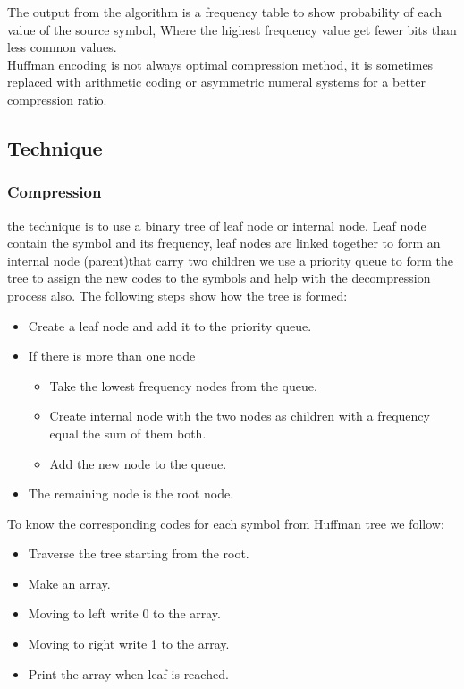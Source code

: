 \documentclass[14 pt,a4paper,double column]{article}
\begin{document}
The output from the algorithm is a frequency table to show  probability of each value of the source symbol, Where the highest frequency value get fewer bits than less common values.\\


Huffman encoding is not always optimal compression method, it is sometimes replaced with arithmetic coding or asymmetric numeral systems for a better compression ratio.\\
\subsection{Technique}
\subsubsection{Compression}
the technique is to use a binary tree of leaf node or internal node. Leaf node contain the symbol and its frequency, leaf nodes are linked together to form an internal node (parent)that carry two children we use a priority queue to form the tree to assign the new codes to the symbols and help with the decompression process also. The following steps show how the tree is formed:


\begin{itemize}
    \item Create a leaf node and add it to the priority queue. 
    \item If there is more than one node 
        \begin{itemize}
            \item Take the lowest frequency nodes from the queue.
            \item Create internal node with the two nodes as children with a frequency equal the sum of them both.
            \item Add the new node to the queue.
        \end{itemize}
    \item The remaining node is the root node.    
\end{itemize}

To know the corresponding codes for each symbol from Huffman tree we follow:
\begin{itemize}
    \item Traverse the tree starting from the root.
    \item Make an array.
    \item Moving to left write 0 to the array.
    \item Moving to right write 1 to the array. 
    \item Print the array when leaf is reached.
\end{itemize}
\end{document}
